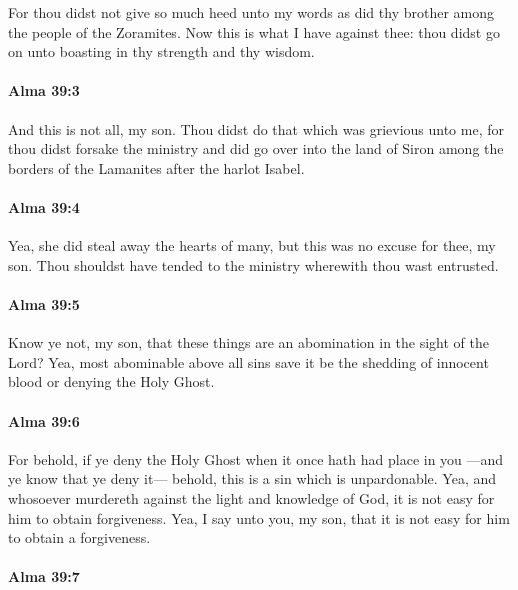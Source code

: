 			For thou didst not give so much heed unto my words
			as did thy brother among the people of the Zoramites.
			Now this is what I have against thee:
			thou didst go on unto boasting in thy strength and thy wisdom.

		\paragraph{Alma 39:3} %
			\label{ALMA-39-3}

			And this is not all, my son.
			Thou didst do that which was grievious unto me,
			for thou didst forsake the ministry
			and did go over into the land of Siron
			among the borders of the Lamanites
			after the harlot Isabel.

		\paragraph{Alma 39:4} %
			\label{ALMA-39-4}

			Yea, she did steal away the hearts of many,
			but this was no excuse for thee, my son.
			Thou shouldst have tended to the ministry wherewith thou wast entrusted.

		\paragraph{Alma 39:5} %
			\label{ALMA-39-5}

			Know ye not, my son, that these things are an abomination in the sight of the Lord?
			Yea, most abominable above all sins
			save it be the shedding of innocent blood or denying the Holy Ghost.

		\paragraph{Alma 39:6} %
			\label{ALMA-39-6}

			For behold, if ye deny the Holy Ghost when it once hath had place in you
			---and ye know that ye deny it---
			behold, this is a sin which is unpardonable.
			Yea, and whosoever murdereth against the light and knowledge of God,
			it is not easy for him to obtain forgiveness.
			Yea, I say unto you, my son,
			that it is not easy for him to obtain a forgiveness.

		\paragraph{Alma 39:7} %
			\label{ALMA-39-7}

